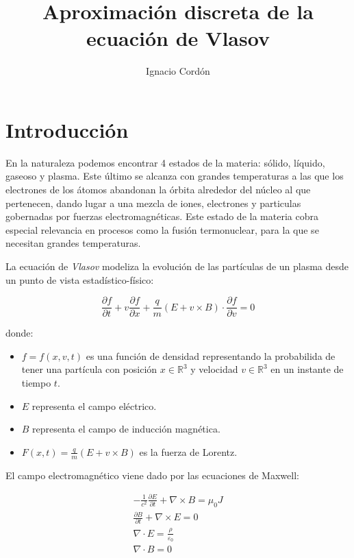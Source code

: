 \documentclass[a4paper,10pt]{scrartcl}
\title{Aproximación discreta de la ecuación de Vlasov}
\author{
	Ignacio Cordón
}
\date{}
\theoremstyle{definition}
\numberwithin{equation}{section}
\begin{document}
\maketitle
\begin{center}
\end{center}
\tableofcontents
\pagebreak

\section{Introducción}
En la naturaleza podemos encontrar 4 estados de la materia: sólido, líquido, gaseoso y plasma. Este último se alcanza con grandes temperaturas a las que los electrones de los átomos abandonan la órbita alrededor del núcleo al que pertenecen, dando lugar a una mezcla de iones, electrones y particulas gobernadas por fuerzas electromagnéticas. Este estado de la materia cobra especial relevancia en procesos como la fusión termonuclear, para la que se necesitan grandes temperaturas.  

La ecuación de \textit{Vlasov} modeliza la evolución de las partículas de un plasma desde un punto de vista estadístico-físico:

\begin{equation}
 \frac{\partial f}{\partial t} + v \frac{\partial f}{\partial x} + \frac{q}{m} (E + v\times B) \cdot \frac{\partial f}{\partial v} = 0
\end{equation}

donde:

\begin{itemize}
 \item $f = f(x,v,t)$ es una función de densidad representando la probabilida de tener una partícula con posición $x \in \mathbb{R}^3$ y velocidad $v \in \mathbb{R}^3$ en un instante de tiempo $t$.
 \item $E$ representa el campo eléctrico.
 \item $B$ representa el campo de inducción magnética.
 \item $F(x,t) = \frac{q}{m}(E + v\times B)$ es la fuerza de Lorentz.
\end{itemize}

El campo electromagnético viene dado por las ecuaciones de Maxwell:

\begin{align*}
 -\frac{1}{c^2} \frac{\partial E}{\partial t} + \nabla \times B = \mu_0 J\\
 \frac{\partial B}{\partial t} + \nabla \times E = 0\\
 \nabla \cdot E = \frac{\rho}{\varepsilon_0}\\
 \nabla \cdot B = 0
\end{align*}
\end{document}
